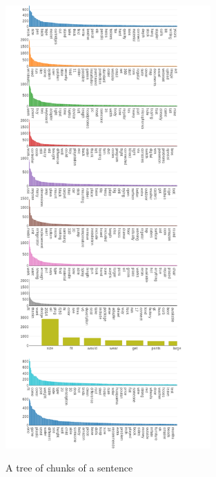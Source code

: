 \documentclass[LaM,binding=0.6cm]{sapthesis}
\begin{document}
\begin{figure}
\centering
\includegraphics[width=0.7\textwidth]{pictures/words1.png}\\[3ex]
\caption{A tree of chunks of a sentence}
\label{fig:chunktree}
\end{figure}
\end{document}
